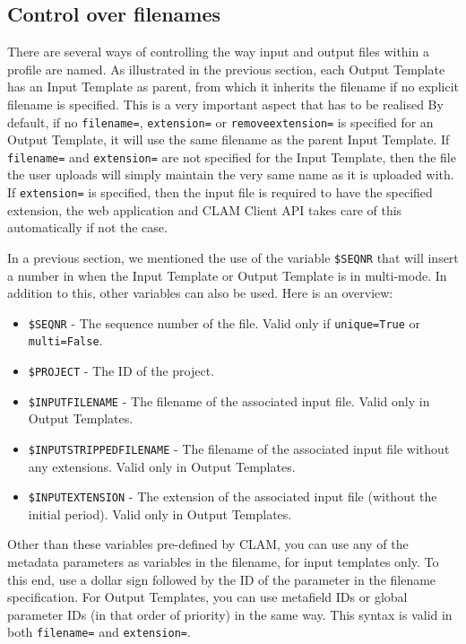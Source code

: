 \documentclass[a4paper,12pt]{report}
\begin{document}
\subsection{Control over filenames}
\label{sec:filenamevariables}

There are several ways of controlling the way input and output files within a
profile are named. As illustrated in the previous section, each Output Template
has an Input Template as parent, from which it inherits the filename if no
explicit filename is specified. This is a very important aspect that has to be
realised By default, if no \texttt{filename=}, \texttt{extension=} or
\texttt{removeextension=} is specified for an Output Template, it will use the
same filename as the parent Input Template. If \texttt{filename=} and
\texttt{extension=} are not specified for the Input Template, then the file the
user uploads will simply maintain the very same name as it is uploaded with. If
\texttt{extension=} is specified, then the input file is required to have the
specified extension, the web application and CLAM Client API takes care of this
automatically if not the case.

In a previous section, we mentioned the use of the variable \texttt{\$SEQNR}
that will insert a number in when the Input Template or Output Template is in
multi-mode. In addition to this, other variables can also be used. Here is an
overview:

\begin{itemize}
\item \texttt{\$SEQNR} - The sequence number of the file. Valid only if \texttt{unique=True} or \texttt{multi=False}.
\item \texttt{\$PROJECT} - The ID of the project.
\item \texttt{\$INPUTFILENAME} - The filename of the associated input file. Valid only in Output Templates.
\item \texttt{\$INPUTSTRIPPEDFILENAME} - The filename of the associated input file without any extensions. Valid only in Output Templates.
\item \texttt{\$INPUTEXTENSION} - The extension of the associated input file (without the initial period). Valid only in Output Templates.
\end{itemize} 

Other than these variables pre-defined by CLAM, you can use
any of the metadata parameters as variables in the filename, for input
templates only. To this end, use a
dollar sign followed by the ID of the parameter in the filename specification.
For Output Templates, you can use metafield IDs or global parameter IDs (in
that order of priority) in the same way. This syntax is valid in both
\texttt{filename=} and \texttt{extension=}.
\end{document}
